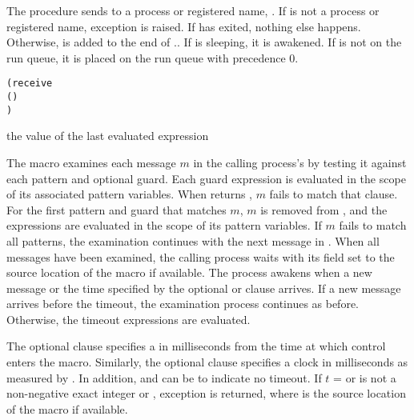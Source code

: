 The  procedure sends  to a process or
registered name, .  If  is not a
process or registered name, exception  is raised.  If  has exited,
nothing else happens.  Otherwise,  is added to the end of
..  If  is sleeping,
it is awakened.  If  is not on the run
queue, it is placed on the run queue with precedence
0.

\begin{syntax}
  \begin{alltt}
(receive
  (    \etc{})
  \etc{})\strut\end{alltt}
\end{syntax}
\returns{} the value of the last evaluated expression

The  macro examines each message $m$ in the calling
process's  by testing it against each pattern and
optional guard. Each guard expression  is evaluated in the
scope of its associated pattern variables.  When  returns
, $m$ fails to match that clause.  For the first pattern
and guard that matches $m$, $m$ is removed from , and
the expressions   \etc{} are evaluated in the scope of
its pattern variables.  If $m$ fails to match all patterns, the
examination continues with the next message in . When
all messages have been examined, the calling process waits with its
 field set to the source location of the 
macro if available. The process awakens when a new message or the time
specified by the optional  or  clause
arrives. If a new message arrives before the timeout, the examination
process continues as before. Otherwise, the timeout expressions
  \etc{} are evaluated.

The optional  clause specifies a  in
milliseconds from the time at which control enters the
 macro.  Similarly, the optional 
clause specifies a clock  in milliseconds as measured by
.  In addition,  and  can be
 to indicate no timeout. If $t$ =  or
 is not a non-negative exact integer or ,
exception  is returned, where
 is the source location of the  macro if
available.

